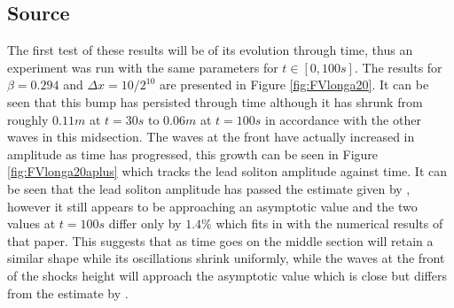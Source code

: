 \documentclass[SingleSpace,12pt,Journal]{Serre_ASCE}
\begin{document}
\subsection{Source}
The first test of these results will be of its evolution through time, thus an experiment was run with the same parameters for $t \in [0,100s]$. The results for $\beta = 0.294$ and $\Delta x = 10/2^{10}$ are presented in Figure \ref{fig:FVlonga20}. It can be seen that this bump has persisted through time although it has shrunk from roughly $0.11m$ at $t = 30s$ to $0.06m$ at $t = 100s$ in accordance with the other waves in this midsection. The waves at the front have actually increased in amplitude as time has progressed, this growth can be seen in Figure \ref{fig:FVlonga20aplus} which tracks the lead soliton amplitude against time. It can be seen that the lead soliton amplitude has passed the estimate given by , however it still appears to be approaching an asymptotic value and the two values at $t = 100s$ differ only by $1.4\%$ which fits in with the numerical results of that paper. This suggests that as time goes on the middle section will retain a similar shape while its oscillations shrink uniformly, while the waves at the front of the shocks height will approach the asymptotic value which is close but differs from the estimate by .
\end{document}
